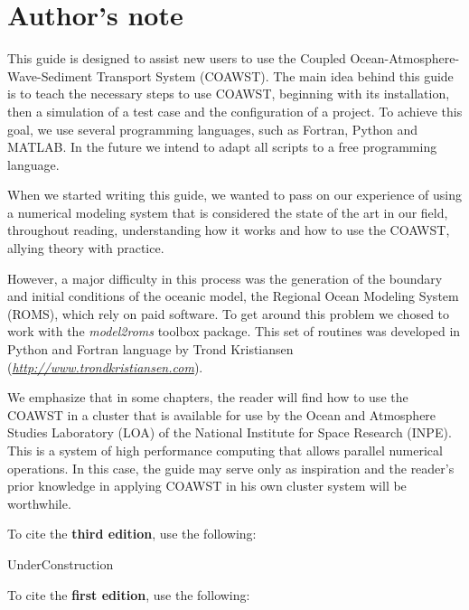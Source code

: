 \chapter*{Author's note}
\bigskip
\noindent This guide is designed to assist new users to use the Coupled Ocean-Atmosphere-Wave-Sediment Transport System (COAWST). The main idea behind this 
guide is to teach the necessary steps to use COAWST, beginning with its installation, then a simulation of a test case and the configuration of a
project. To achieve this goal, we use several programming languages, such as Fortran, Python and MATLAB. In the future we intend to adapt all scripts
to a free programming language.
\bigskip

\noindent When we started writing this guide, we wanted to pass on our experience of using a numerical modeling system that is considered the state of the art in our field, 
throughout reading, understanding how it works and how to use the COAWST, allying theory with practice.
\bigskip

\noindent However, a major difficulty in this process was the generation of the boundary and initial conditions of the oceanic model, the Regional Ocean Modeling System (ROMS),
which rely on paid software. To get around this problem we chosed to work with the \textit {model2roms} toolbox package. This set of routines was developed in Python and 
Fortran language by Trond Kristiansen (\textit{\textcolor{bleu_cite} {\href{http://www.trondkristiansen.com}{http://www.trondkristiansen.com}}}).
\bigskip

\noindent We emphasize that in some chapters, the reader will find how to use the COAWST in a cluster that is available for use by the Ocean and Atmosphere 
Studies Laboratory (LOA) of the National Institute for Space Research (INPE). This is a system of high performance computing that allows parallel numerical operations. 
In this case, the guide may serve only as inspiration and the reader's prior knowledge in applying COAWST in his own cluster system will be worthwhile.
\bigskip

\noindent To cite the \textbf{third edition}, use the following:
\bigskip

\noindent UnderConstruction

\bigskip
\pagebreak 

\noindent To cite the \textbf{first edition}, use the following:

\bigskip

